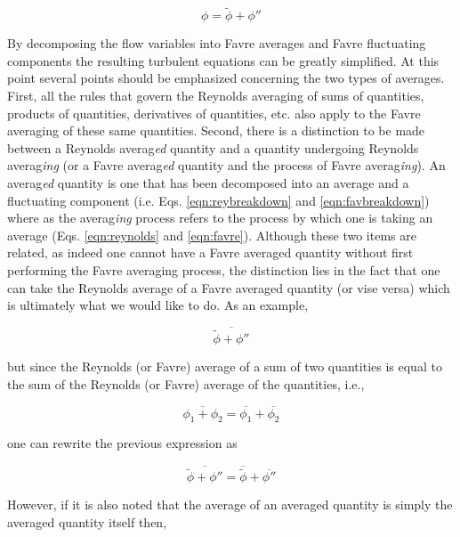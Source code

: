 \begin{equation}
	\phi = \tilde{\phi} + \phi''
\label{eqn:favbreakdown}
\end{equation}

	By decomposing the flow variables into Favre averages and Favre fluctuating components the
resulting turbulent equations can be greatly simplified.  At this point several points should be emphasized
concerning the two types of averages.  First, all the rules that govern the Reynolds averaging of sums of 
quantities, products of quantities, derivatives of quantities, etc. also apply to the Favre averaging of 
these same quantities.  Second, there is a distinction to be made between a Reynolds averag\emph{ed} quantity 
and a quantity undergoing Reynolds averag\emph{ing} (or a Favre averag\emph{ed} quantity and the process of 
Favre averag\emph{ing}).  An averag\emph{ed} quantity is one that has been decomposed into an average and
a fluctuating component (i.e. Eqs. \ref{eqn:reybreakdown} and \ref{eqn:favbreakdown}) where as the averag\emph{ing}
process refers to the process by which one is taking an average (Eqs. \ref{eqn:reynolds} and \ref{eqn:favre}).
Although these two items are related, as indeed one cannot have a Favre averaged quantity without first performing
the Favre averaging process, the distinction lies in the fact that one can take the Reynolds average of a Favre
averaged quantity (or vise versa) which is ultimately what we would like to do.  As an example,

\begin{displaymath}
	\overline{\tilde{\phi}+\phi''}
\end{displaymath}

	but since the Reynolds (or Favre) average of a sum of two quantities is equal to the sum of the Reynolds
(or Favre) average of the quantities, i.e., 

\begin{equation}
	\overline{\phi_1 + \phi_2} = \overline{\phi_1} + \overline{\phi_2}
\label{eqn:sums}	
\end{equation}	 

	one can rewrite the previous expression as

\begin{displaymath}
	\overline{\tilde{\phi} + \phi''} = \overline{\tilde{\phi}} + \overline{\phi''} 
\end{displaymath}

	However, if it is also noted that the average of an averaged quantity is simply the averaged 
quantity itself then,

